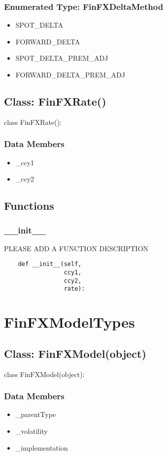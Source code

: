 \documentclass[twoside,11pt]{book}
\begin{document}
\subsubsection{Enumerated Type: FinFXDeltaMethod}
\begin{itemize}
\item{SPOT\_DELTA}
\item{FORWARD\_DELTA}
\item{SPOT\_DELTA\_PREM\_ADJ}
\item{FORWARD\_DELTA\_PREM\_ADJ}
\end{itemize}

\subsection*{Class: FinFXRate()}
class FinFXRate(): 

\subsubsection*{Data Members}
\begin{itemize}
\item{\_ccy1}
\item{\_ccy2}
\end{itemize}

\subsection*{Functions}

\subsubsection*{{\bf \_\_init\_\_}}
PLEASE ADD A FUNCTION DESCRIPTION

\begin{lstlisting}
    def __init__(self,
                 ccy1,
                 ccy2,
                 rate):
\end{lstlisting}

\newpage
\section{FinFXModelTypes}

\subsection*{Class: FinFXModel(object)}
class FinFXModel(object): 

\subsubsection*{Data Members}
\begin{itemize}
\item{\_parentType}
\item{\_volatility}
\item{\_implementation}
\end{itemize}
\end{document}
